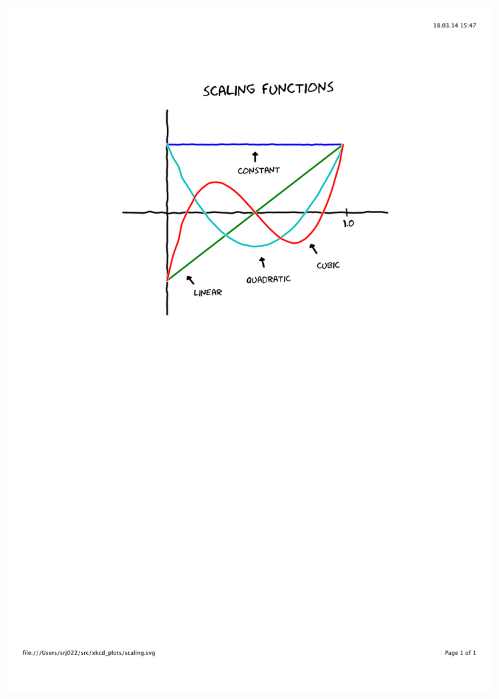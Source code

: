 \begin{frame}
\begin{columns}
\begin{column}[b]{0.55\linewidth}
    \end{column}
    \begin{column}[b]{0.45\linewidth}
    \centering
    \includegraphics[scale=0.3, clip, viewport=150 450 450 750]
        {figures/scaling.pdf}\\

\end{column}
\end{columns}
\end{frame}
